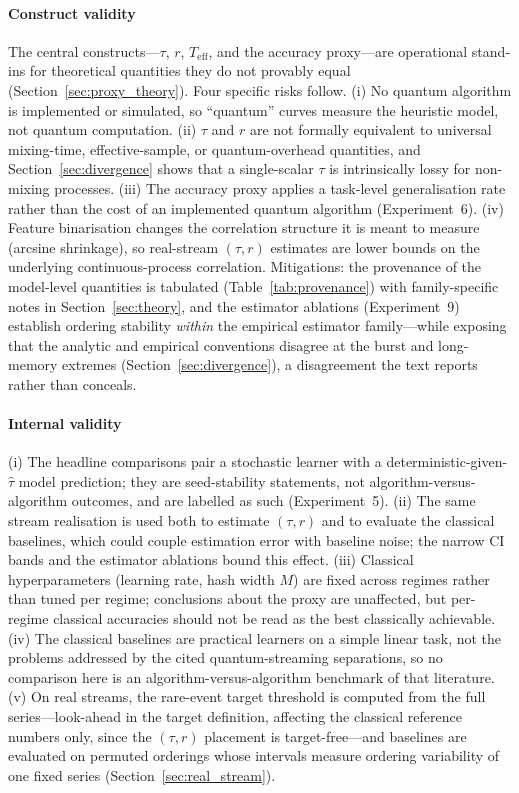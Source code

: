 \documentclass[sensors,article,submit,pdftex,moreauthors]{Definitions/mdpi}
\newcommand{\Teff}{T_{\mathrm{eff}}}
\begin{document}
\paragraph{Construct validity} The central constructs---$\tau$, $r$, $\Teff$, and the accuracy proxy---are operational stand-ins for theoretical quantities they do not provably equal (Section~\ref{sec:proxy_theory}). Four specific risks follow. (i) No quantum algorithm is implemented or simulated, so ``quantum'' curves measure the heuristic model, not quantum computation. (ii) $\tau$ and $r$ are not formally equivalent to universal mixing-time, effective-sample, or quantum-overhead quantities, and Section~\ref{sec:divergence} shows that a single-scalar $\tau$ is intrinsically lossy for non-mixing processes. (iii) The accuracy proxy applies a task-level generalisation rate rather than the cost of an implemented quantum algorithm (Experiment~6). (iv) Feature binarisation changes the correlation structure it is meant to measure (arcsine shrinkage), so real-stream $(\tau, r)$ estimates are lower bounds on the underlying continuous-process correlation. Mitigations: the provenance of the model-level quantities is tabulated (Table~\ref{tab:provenance}) with family-specific notes in Section~\ref{sec:theory}, and the estimator ablations (Experiment~9) establish ordering stability \emph{within} the empirical estimator family---while exposing that the analytic and empirical conventions disagree at the burst and long-memory extremes (Section~\ref{sec:divergence}), a disagreement the text reports rather than conceals.

\paragraph{Internal validity} (i) The headline comparisons pair a stochastic learner with a deterministic-given-$\hat{\tau}$ model prediction; they are seed-stability statements, not algorithm-versus-algorithm outcomes, and are labelled as such (Experiment~5). (ii) The same stream realisation is used both to estimate $(\tau, r)$ and to evaluate the classical baselines, which could couple estimation error with baseline noise; the narrow CI bands and the estimator ablations bound this effect. (iii) Classical hyperparameters (learning rate, hash width $M$) are fixed across regimes rather than tuned per regime; conclusions about the proxy are unaffected, but per-regime classical accuracies should not be read as the best classically achievable. (iv) The classical baselines are practical learners on a simple linear task, not the problems addressed by the cited quantum-streaming separations, so no comparison here is an algorithm-versus-algorithm benchmark of that literature. (v) On real streams, the rare-event target threshold is computed from the full series---look-ahead in the target definition, affecting the classical reference numbers only, since the $(\tau, r)$ placement is target-free---and baselines are evaluated on permuted orderings whose intervals measure ordering variability of one fixed series (Section~\ref{sec:real_stream}).
\end{document}
